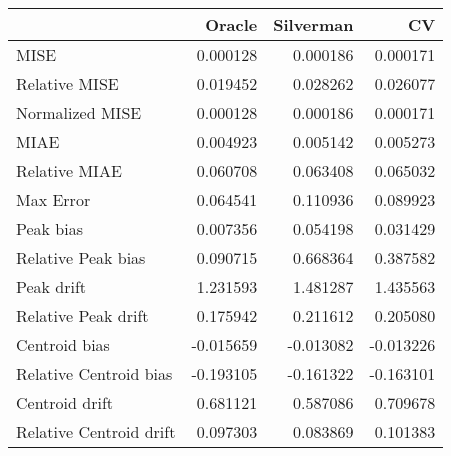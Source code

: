 \begin{tabular}{lrrr}
  \hline
 & Oracle & Silverman & CV \\ 
  \hline
MISE & 0.000128 & 0.000186 & 0.000171 \\ 
  Relative MISE & 0.019452 & 0.028262 & 0.026077 \\ 
  Normalized MISE & 0.000128 & 0.000186 & 0.000171 \\ 
  MIAE & 0.004923 & 0.005142 & 0.005273 \\ 
  Relative MIAE & 0.060708 & 0.063408 & 0.065032 \\ 
  Max Error & 0.064541 & 0.110936 & 0.089923 \\ 
  Peak bias & 0.007356 & 0.054198 & 0.031429 \\ 
  Relative Peak bias & 0.090715 & 0.668364 & 0.387582 \\ 
  Peak drift & 1.231593 & 1.481287 & 1.435563 \\ 
  Relative Peak drift & 0.175942 & 0.211612 & 0.205080 \\ 
  Centroid bias & -0.015659 & -0.013082 & -0.013226 \\ 
  Relative Centroid bias & -0.193105 & -0.161322 & -0.163101 \\ 
  Centroid drift & 0.681121 & 0.587086 & 0.709678 \\ 
  Relative Centroid drift & 0.097303 & 0.083869 & 0.101383 \\ 
   \hline
\end{tabular}
